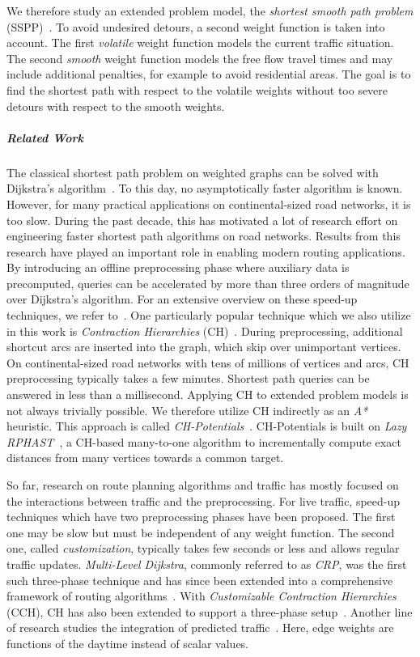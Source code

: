 \documentclass[a4paper,UKenglish,cleveref, autoref, thm-restate]{lipics-v2021}
\begin{document}
We therefore study an extended problem model, the \emph{shortest smooth path problem} (SSPP)~\cite{dss-tarrn-18}.
To avoid undesired detours, a second weight function is taken into account.
The first \emph{volatile} weight function models the current traffic situation.
The second \emph{smooth} weight function models the free flow travel times and may include additional penalties, for example to avoid residential areas.
The goal is to find the shortest path with respect to the volatile weights without too severe detours with respect to the smooth weights.

\subparagraph{Related Work}

The classical shortest path problem on weighted graphs can be solved with Dijkstra's algorithm~\cite{d-ntpcg-59}.
To this day, no asymptotically faster algorithm is known.
However, for many practical applications on continental-sized road networks, it is too slow.
During the past decade, this has motivated a lot of research effort on engineering faster shortest path algorithms on road networks.
Results from this research have played an important role in enabling modern routing applications.
By introducing an offline preprocessing phase where auxiliary data is precomputed, queries can be accelerated by more than three orders of magnitude over Dijkstra's algorithm.
For an extensive overview on these speed-up techniques, we refer to~\cite{bdgmpsww-rptn-16}.
One particularly popular technique which we also utilize in this work is \emph{Contraction Hierarchies} (CH)~\cite{gssv-erlrn-12}.
During preprocessing, additional shortcut arcs are inserted into the graph, which skip over unimportant vertices.
On continental-sized road networks with tens of millions of vertices and arcs, CH preprocessing typically takes a few minutes.
Shortest path queries can be answered in less than a millisecond.
Applying CH to extended problem models is not always trivially possible.
We therefore utilize CH indirectly as an \emph{A*}~\cite{hnr-afbhd-68} heuristic.
This approach is called \emph{CH-Potentials}~\cite{strasser_et_al:LIPIcs.SEA.2021.6}.
CH-Potentials is built on \emph{Lazy RPHAST}~\cite{strasser_et_al:LIPIcs.SEA.2021.6}, a CH-based many-to-one algorithm to incrementally compute exact distances from many vertices towards a common target.

So far, research on route planning algorithms and traffic has mostly focused on the interactions between traffic and the preprocessing.
For live traffic, speed-up techniques which have two preprocessing phases have been proposed.
The first one may be slow but must be independent of any weight function.
The second one, called \emph{customization}, typically takes few seconds or less and allows regular traffic updates.
\emph{Multi-Level Dijkstra}, commonly referred to as \emph{CRP}, was the first such three-phase technique and has since been extended into a comprehensive framework of routing algorithms~\cite{bdgmpsww-rptn-16}.
With \emph{Customizable Contraction Hierarchies} (CCH), CH has also been extended to support a three-phase setup~\cite{dsw-cch-15}.
Another line of research studies the integration of predicted traffic~\cite{dn-crdtd-12,bgsv-mtdtt-13,bdpw-dtdrp-16,swz-sfert-21}.
Here, edge weights are functions of the daytime instead of scalar values.
\end{document}
